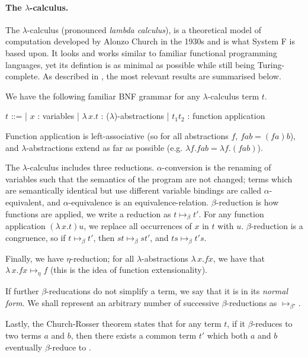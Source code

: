\documentclass[logo,bsc,singlespacing,parskip,online]{infthesis}
\begin{document}
\paragraph*{The $\lambda$-calculus.} The $\lambda$-calculus (pronounced \textit{lambda calculus}), is a theoretical model of computation developed by Alonzo Church in the 1930s and is what System F is based upon. It looks and works similar to familiar functional programming languages, yet its defintion is as minimal as possible while still being Turing-complete. As described in \cite{pierce_types_2002}, the most relevant results are summarised below.

We have the following familiar BNF grammar for any $\lambda$-calculus term $t$.

\begin{center}
\begin{bnf}
  $t$ ::=
  | $x$ : variables
  | $\lambda \, x. t$ : ($\lambda$)-abstractions
  | $t_1 t_2$ : function application
\end{bnf}
\end{center}

Function application is left-associative (so for all abstractions $f$, $f a b = (f a) b$), and $\lambda$-abstractions extend as far as possible (e.g. $\lambda f. f a b = \lambda f. (f a b)$).

The $\lambda$-calculus includes three reductions. $\alpha$-conversion is the renaming of variables such that the semantics of the program are not changed; terms which are semantically identical but use different variable bindings are called $\alpha$-equivalent, and $\alpha$-equivalence is an equivalence-relation. $\beta$-reduction is how functions are applied, we write a reduction as $t \mapsto_{\beta} t'$. For any function application $(\lambda \, x. t) u$, we replace all occurrences of $x$ in $t$ with $u$. $\beta$-reduction is a congruence, so if $t \mapsto_{\beta} t'$, then $st \mapsto_{\beta} st'$, and $ts \mapsto_{\beta} t's$.

Finally, we have $\eta$-reduction; for all $\lambda$-abstractions $\lambda \, x. f x$, we have that $\lambda \, x. f x \mapsto_{\eta} f$ (this is the idea of function extensionality).
  
If further $\beta$-reducations do not simplify a term, we say that it is in its \textit{normal form}. We shall represent an arbitrary number of successive $\beta$-reductions as $\mapsto_{\beta^{\star}}$.

Lastly, the Church-Rosser theorem states that for any term $t$, if it $\beta$-reduces to two terms $a$ and $b$, then there exists a common term $t'$ which both $a$ and $b$ eventually $\beta$-reduce to \citep{church_properties_1936}.
\end{document}
